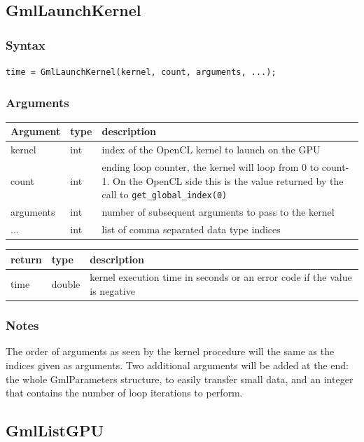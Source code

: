 \documentclass[a4paper,12pt]{article}
\begin{document}
\subsection{GmlLaunchKernel}
\subsubsection*{Syntax}
{\tt time = GmlLaunchKernel(kernel, count, arguments, ...);}
\subsubsection*{Arguments}

\begin{tabular}{|m{2cm}|m{1.5cm}|m{10.5cm}|}
\hline
Argument   & type  & description \\
\hline
kernel     & int   & index of the OpenCL kernel to launch on the GPU \\
\hline
count      & int   & ending loop counter, the kernel will loop from 0 to count-1. On the OpenCL side this is the value returned by the call to {\tt get\_global\_index(0)} \\
\hline
arguments  & int   & number of subsequent arguments to pass to the kernel \\
\hline
...        & int   & list of comma separated data type indices \\
\hline
\end{tabular}

\medskip

\begin{tabular}{|m{2cm}|m{1.5cm}|m{10.5cm}|}
\hline
return    & type   & description \\
\hline
time      & double & kernel execution time in seconds or an error code if the  value is negative \\
\hline
\end{tabular}

\subsubsection*{Notes}
The order of arguments as seen by the kernel procedure will the same as the indices given as arguments. Two additional arguments will be added at the end: the whole GmlParameters structure, to easily transfer small data, and an integer that contains the number of loop iterations to perform.


\subsection{GmlListGPU}
\end{document}
